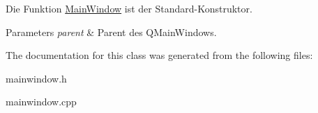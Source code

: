 Die Funktion \hyperlink{class_main_window}{Main\+Window} ist der Standard-\/\+Konstruktor. 


\begin{DoxyParams}{Parameters}
{\em parent} & Parent des Q\+Main\+Windows. \\
\hline
\end{DoxyParams}


The documentation for this class was generated from the following files\+:\begin{DoxyCompactItemize}
\item 
mainwindow.\+h\item 
mainwindow.\+cpp\end{DoxyCompactItemize}
